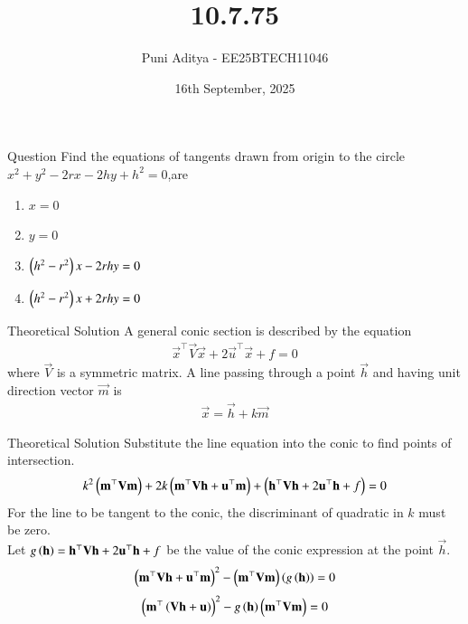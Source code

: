 \documentclass{beamer}
\title{10.7.75}
\date{16th September, 2025}
\author{Puni Aditya - EE25BTECH11046}
\begin{document}
\frame{\titlepage}
\begin{frame}{Question}
Find the equations of tangents drawn from origin to the circle $x^2+y^2-2rx-2hy+h^2=0$,are
\begin{enumerate}
    \item $x=0$
    \item $y=0$
    \item $\left(h^2-r^2\right)x-2rhy=0$
    \item $\left(h^2-r^2\right)x+2rhy=0$
\end{enumerate}
\end{frame}

\begin{frame}{Theoretical Solution}
A general conic section is described by the equation
\begin{align}
    \vec{x}^\top \vec{V} \vec{x} + 2\vec{u}^\top \vec{x} + f = 0
\end{align}
where $\vec{V}$ is a symmetric matrix. A line passing through a point $\vec{h}$ and having unit direction vector $\vec{m}$ is
\begin{align}
    \vec{x} = \vec{h} + k\vec{m}
\end{align}
\end{frame}

\begin{frame}{Theoretical Solution}
Substitute the line equation into the conic to find points of intersection.
\begin{align}
    k^2\left(\mathbf{m}^\top\mathbf{V}\mathbf{m}\right) + 2k\left(\mathbf{m}^\top\mathbf{V}\mathbf{h} + \mathbf{u}^\top\mathbf{m}\right) + \left(\mathbf{h}^\top\mathbf{V}\mathbf{h} + 2\mathbf{u}^\top\mathbf{h} + f\right) = 0
\end{align}
For the line to be tangent to the conic, the discriminant of quadratic in $k$ must be zero. \\
Let $g\left(\mathbf{h}\right) = \mathbf{h}^\top\mathbf{V}\mathbf{h} + 2\mathbf{u}^\top\mathbf{h} + f$ be the value of the conic expression at the point $\vec{h}$.
\begin{align}
    \left(\mathbf{m}^\top\mathbf{V}\mathbf{h} + \mathbf{u}^\top\mathbf{m}\right)^2 - \left(\mathbf{m}^\top\mathbf{V}\mathbf{m}\right)\left(g\left(\mathbf{h}\right)\right) = 0
\end{align}
\begin{align}
\left(\mathbf{m}^\top \left(\mathbf{V}\mathbf{h} + \mathbf{u}\right)\right)^2 - g\left(\mathbf{h}\right)\left(\mathbf{m}^\top\mathbf{V}\mathbf{m}\right) = 0
\end{align}
\end{frame}
\end{document}
